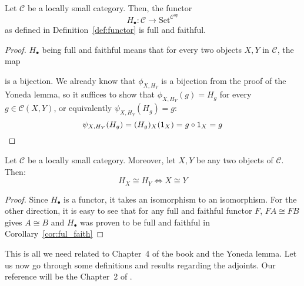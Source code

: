 \begin{corollary}[4.3.7]\label{cor:ful_faith} Let $\mathcal{C}$ be a locally small category. Then, the functor
\[H_{\bullet}:\mathcal{C}\to\mathrm{Set}^{\mathcal{C}^{\mathrm{op}}}\]
as defined in Definition~\ref{def:functor} is full and faithful.
\end{corollary}
\begin{proof} $H_{\bullet}$ being full and faithful means that for every two objects $X,Y$ in $\mathcal{C}$, the map
\begin{center}
\end{center}
is a bijection. We already know that $\phi_{X,H_Y}$ is a bijection from the proof of the Yoneda lemma, so it suffices to show that $\phi_{X,H_Y}(g)=H_g$ for every $g\in\mathcal{C}(X,Y)$, or equivalently $\psi_{X,H_Y}(H_g)=g$:
\[\psi_{X,H_Y}(H_g)=(H_g)_X(1_X)=g\circ 1_X=g\qedhere\]
\end{proof}
\begin{proposition}[4.3.10]\label{prop:unique} Let $\mathcal{C}$ be a locally small category. Moreover, let $X,Y$ be any two objects of $\mathcal{C}$. Then:
\[H_X\cong H_Y \Longleftrightarrow X\cong Y\]
\end{proposition}
\begin{proof} Since $H_{\bullet}$ is a functor, it takes an isomorphism to an isomorphism. For the other direction, it is easy to see that for any full and faithful functor $F$, $FA\cong FB$ gives $A\cong B$ and $H_{\bullet}$ was proven to be full and faithful in Corollary~\ref{cor:ful_faith}
\end{proof}

This is all we need related to Chapter~4 of the book and the Yoneda lemma. Let us now go through some definitions and results regarding the adjoints. Our reference will be the Chapter~2 of \cite{basic_cat}.

